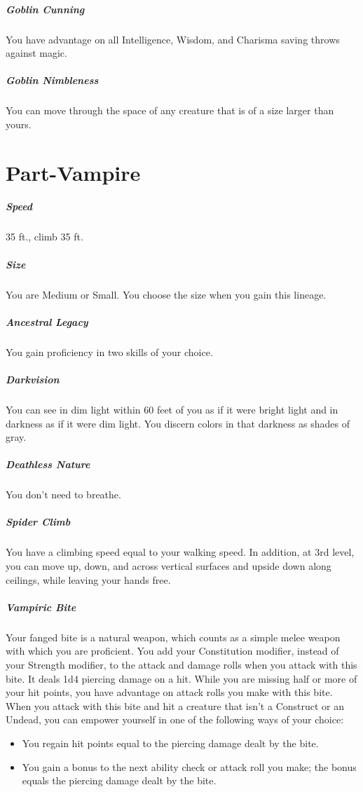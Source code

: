 \documentclass[a4paper,twocolumn,openany,nodeprecatedcode]{dndbook}
\begin{document}
        \subparagraph{Goblin Cunning} You have advantage on all Intelligence, Wisdom, and Charisma saving throws against magic.

        \subparagraph{Goblin Nimbleness} You can move through the space of any creature that is of a size larger than yours.


    \section{Part-Vampire}

        \subparagraph{Speed} 35 ft., climb 35 ft.

        \subparagraph{Size} You are Medium or Small. You choose the size when you gain this lineage.

        \subparagraph{Ancestral Legacy} You gain proficiency in two skills of your choice.

        \subparagraph{Darkvision} You can see in dim light within 60 feet of you as if it were bright light and in darkness as if it were dim light. You discern colors in that darkness as shades of gray.

        \subparagraph{Deathless Nature} You don't need to breathe.

        \subparagraph{Spider Climb} You have a climbing speed equal to your walking speed. In addition, at 3rd level, you can move up, down, and across vertical surfaces and upside down along ceilings, while leaving your hands free.

        \subparagraph{Vampiric Bite} Your fanged bite is a natural weapon, which counts as a simple melee weapon with which you are proficient. You add your Constitution modifier, instead of your Strength modifier, to the attack and damage rolls when you attack with this bite. It deals 1d4 piercing damage on a hit. While you are missing half or more of your hit points, you have advantage on attack rolls you make with this bite.\\
        When you attack with this bite and hit a creature that isn't a Construct or an Undead, you can empower yourself in one of the following ways of your choice:

        \begin{itemize}
            \item You regain hit points equal to the piercing damage dealt by the bite.
            \item You gain a bonus to the next ability check or attack roll you make; the bonus equals the piercing damage dealt by the bite.
        \end{itemize}
\end{document}
